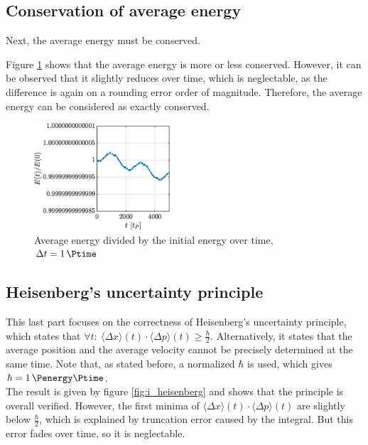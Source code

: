 \documentclass[a4paper,12pt,twoside]{article}
\begin{document}
  \subsection{Conservation of average energy}
    Next, the average energy must be conserved.

    Figure \ref{fig:i_E} shows that the average energy is more or less conserved.
    However, it can be observed that it slightly reduces over time, which is neglectable, as the difference is again on a rounding error order of magnitude.
    Therefore, the average energy can be considered as exactly conserved.

    \begin{figure}[h]
      \centering
      \includegraphics[width=0.45\textwidth]{graphs/i_E.eps}
      \caption{Average energy divided by the initial energy over time, $\Delta t = \SI{1}{\Ptime}$}
      \label{fig:i_E}
    \end{figure}

  \subsection{Heisenberg's uncertainty principle}
    This last part focuses on the correctness of Heisenberg's uncertainty principle, which states that $\forall t:~\langle \Delta x \rangle(t)\cdot\langle \Delta p \rangle(t) \geq \frac{\hbar}{2}$.
    Alternatively, it states that the average position and the average velocity cannot be precisely determined at the same time.
    Note that, as stated before, a normalized $\hbar$ is used, which gives $\hbar=\SI{1}{\Penergy\Ptime}$.\\

    The result is given by figure \ref{fig:i_heisenberg} and shows that the principle is overall verified.
    However, the first minima of $\langle \Delta x \rangle(t)\cdot\langle \Delta p \rangle(t)$ are slightly below $\frac{\hbar}{2}$, which is explained by truncation error caused by the integral.
    But this error fades over time, so it is neglectable.
\end{document}
